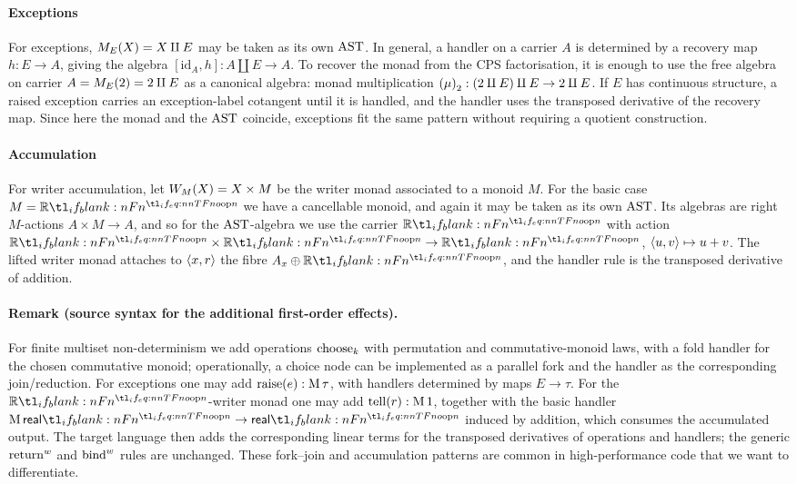 \documentclass[11pt,a4paper]{article}
\theoremstyle{definition}
\theoremstyle{remark}
\providecommand{\id}{\mathrm{id}}
\begin{document}
\paragraph{Exceptions}
For exceptions, \( \Fun[nn]{ M_{E} }{ X } = X \amalg E \) may be taken as its own \( \opn{AST} \). In general, a handler on a carrier \(A\) is determined by a recovery map \(h:E\to A\), giving the algebra \( [\id_A,h]:A\amalg E\to A\).
To recover the monad from the CPS factorisation, it is enough to use the free algebra on carrier \(A=\Fun[nn]{ M_E }{ 2 }=2\amalg E\) as a canonical algebra: monad multiplication \( \Nat[nn]{ \mu }{ 2 }: \left( 2 \amalg E \right) \amalg E \to 2 \amalg E \).
If \(E\) has continuous structure, a raised exception carries an exception-label cotangent until it is handled, and the handler uses the transposed derivative of the recovery map.
Since here the monad and the \( \opn{AST} \) coincide, exceptions fit the same pattern without requiring a quotient construction.

\paragraph{Accumulation}
For writer accumulation, let \( \Fun[nn]{ W_{M} }{ X } = X \times M\) be the writer monad associated to a monoid \(M\). For the basic case \( M = \R[n] \) we have a cancellable monoid, and again it may be taken as its own \( \opn{AST} \). Its algebras are right \(M\)-actions \(A\times M\to A\), and so for the \( \opn{AST} \)-algebra we use the carrier \(\R[n]\) with action \( \R[n] \times \R[n] \to \R[n] \), \( \left\langle  u, v \right\rangle \mapsto u + v \).
The lifted writer monad attaches to \(\left\langle x,r\right\rangle\) the fibre \(A_x\oplus\R[n]\), and the handler rule is the transposed derivative of addition.

\paragraph{Remark (source syntax for the additional first-order effects).}
For finite multiset non-determinism we add operations \(\opn[b]{choose}_k\) with permutation and commutative-monoid laws, with a fold handler for the chosen commutative monoid; operationally, a choice node can be implemented as a parallel fork and the handler as the corresponding join/reduction. For exceptions one may add \(\fn[n]{\opn[b]{raise}}{e}:\opn[b]{M}\tau\), with handlers determined by maps \(E\to\tau\). For the \(\R[n]\)-writer monad one may add \(\fn[n]{\opn[b]{tell}}{r}:\opn[b]{M}1\), together with the basic handler \(\opn[b]{M}\srcreal[n]\to\srcreal[n]\) induced by addition, which consumes the accumulated output. The target language then adds the corresponding linear terms for the transposed derivatives of operations and handlers; the generic \(\opn[b]{return}^{w}\) and \(\opn[b]{bind}^{w}\) rules are unchanged. These fork--join and accumulation patterns are common in high-performance code that we want to differentiate.
\end{document}
